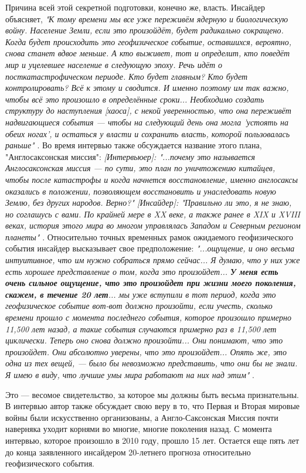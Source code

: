 \documentclass[10pt,twocolumn,letterpaper]{article}
\begin{document}
Причина всей этой секретной подготовки, конечно же, власть. Инсайдер объясняет, \textit{"К тому времени мы все уже переживём ядерную и биологическую войну. Население Земли, если это произойдёт, будет радикально сокращено. Когда будет происходить это геофизическое событие, оставшихся, вероятно, снова станет вдвое меньше. А кто выживет, тот и определит, кто поведёт мир и уцелевшее население в следующую эпоху. Речь идёт о посткатастрофическом периоде. Кто будет главным? Кто будет контролировать? Всё к этому и сводится. И именно поэтому им так важно, чтобы всё это произошло в определённые сроки... Необходимо создать структуру до наступления [хаоса], с некой уверенностью, что она переживёт надвигающиеся события — чтобы на следующий день она могла 'устоять на обеих ногах', и остаться у власти и сохранить власть, которой пользовалась раньше"} \cite{4}. Во время интервью также обсуждается название этого плана, "Англосаксонская миссия": \textit{[Интервьюер]: "...почему это называется Англосаксонская миссия — по сути, это план по уничтожению китайцев, чтобы после катастрофы и когда начнется восстановление, именно англосаксы оказались в положении, позволяющем восстановить и унаследовать новую Землю, без других народов. Верно?" [Инсайдер]: "Правильно ли это, я не знаю, но соглашусь с вами. По крайней мере в XX веке, а также ранее в XIX и XVIII веках, история этого мира во многом управлялась Западом и Северным регионом планеты"} \cite{4}.
Относительно точных временных рамок ожидаемого геофизического события инсайдер высказывает свое предположение: \textit{"...ощущение, и оно весьма интуитивное, что им нужно собраться прямо сейчас... Я думаю, что у них уже есть хорошее представление о том, когда это произойдет... \textbf{У меня есть очень сильное ощущение, что это произойдет при жизни моего поколения, скажем, в течение 20 лет}... мы уже вступили в тот период, когда это геофизическое событие вот-вот должно произойти, если учесть, сколько времени прошло с момента последнего события, которое произошло примерно 11,500 лет назад, а такие события случаются примерно раз в 11,500 лет циклически. Теперь оно снова должно произойти... Они понимают, что это произойдет. Они абсолютно уверены, что это произойдет... Опять же, это одна из тех вещей, — было бы невозможно представить, что они бы не знали. Я имею в виду, что лучшие умы мира работают на них над этим"} \cite{4}.

Это — весомое свидетельство, за которое мы должны быть весьма признательны. В интервью автор также обсуждает свою веру в то, что Первая и Вторая мировые войны были искусственно организованы, а Англо-Саксонская Миссия почти наверняка уходит корнями во многие, многие поколения назад. С момента интервью, которое произошло в 2010 году, прошло 15 лет. Остается еще пять лет до конца заявленного инсайдером 20-летнего прогноза относительно геофизического события.
\end{document}
